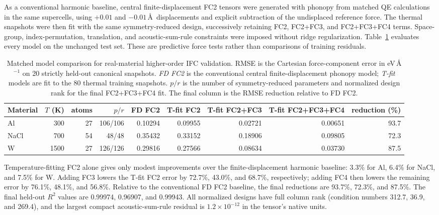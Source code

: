 \documentclass[aps,prb,reprint,amsmath,amssymb,floatfix]{revtex4-2}
\begin{document}
\color{revisionblue}
As a conventional harmonic baseline, central finite-displacement FC2 tensors
were generated with phonopy from matched QE calculations in the same
supercells, using \(+\!0.01\) and \(-\!0.01\)\,\AA\ displacements and
explicit subtraction of the undisplaced reference force.  The thermal
snapshots were then fit with the same symmetry-reduced design,
successively retaining FC2, FC2+FC3, and FC2+FC3+FC4 terms.  Space-group,
index-permutation, translation, and acoustic-sum-rule constraints were imposed
without ridge regularization.  Table~\ref{tab:ifc34} evaluates every model on
the unchanged test set.  These are predictive force tests rather than
comparisons of training residuals.
\color{black}

\color{revisionblue}
\begin{table}[htbp]
\color{black}

\color{revisionblue}
\caption{Matched model comparison for real-material higher-order IFC
validation. RMSE is the Cartesian force-component error in
eV\,\AA\(^{-1}\) on 20 strictly held-out canonical snapshots.
\emph{FD FC2} is the conventional central finite-displacement phonopy model;
\emph{T-fit} models are fit to the 80 thermal training snapshots. \(p/r\) is
the number of symmetry-reduced parameters and normalized design rank for the
final FC2+FC3+FC4 fit. The final column is the RMSE reduction relative to
FD FC2.}
\begin{ruledtabular}
\begin{tabular}{lrrrrrrrr}
Material & \(T\) (K) & atoms & \(p/r\) & FD FC2 &
T-fit FC2 & T-fit FC2+FC3 & T-fit FC2+FC3+FC4 & reduction (\%) \\
\hline
Al   & 300  & 27 & 106/106 & 0.10294 & 0.09955 & 0.02721 & 0.00651 & 93.7 \\
NaCl & 700  & 54 &  48/48  & 0.35432 & 0.33152 & 0.18906 & 0.09805 & 72.3 \\
W    & 1500 & 27 & 126/126 & 0.29816 & 0.27566 & 0.08634 & 0.03730 & 87.5 \\
\end{tabular}
\end{ruledtabular}
\label{tab:ifc34}
\color{black}

\color{revisionblue}
\end{table}
\color{black}

\color{revisionblue}
Temperature-fitting FC2 alone gives only modest improvements over the
finite-displacement harmonic baseline: 3.3\% for Al, 6.4\% for NaCl, and
7.5\% for W.  Adding FC3 lowers the T-fit FC2 error by 72.7\%, 43.0\%, and
68.7\%, respectively; adding FC4 then lowers the remaining error by 76.1\%,
48.1\%, and 56.8\%.  Relative to the conventional FD FC2 baseline, the final
reductions are 93.7\%, 72.3\%, and 87.5\%.  The final held-out \(R^2\) values
are 0.99974, 0.96907, and 0.99943.  All normalized designs have full column
rank (condition numbers 312.7, 36.9, and 269.4), and the largest compact
acoustic-sum-rule residual is \(1.2\times10^{-12}\) in the tensor's native
units.
\color{black}
\end{document}
